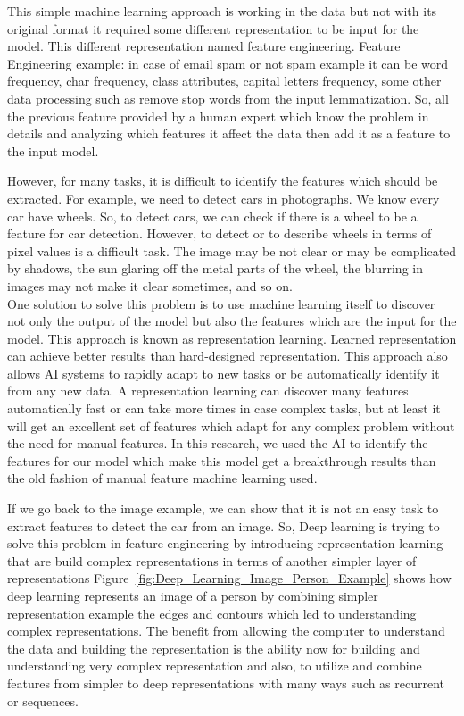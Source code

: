       This simple machine learning approach is working in the data but not with its original format it required some different representation to be input for the model. This different representation named feature engineering. Feature Engineering example: in case of email spam or not spam example it can be word frequency, char frequency, class attributes, capital letters frequency, some other data processing such as remove stop words from the input lemmatization. So, all the previous feature provided by a human expert which know the problem in details and analyzing which features it affect the data then add it as a feature to the input model.
      

      However, for many tasks, it is difficult to identify the features which should be extracted. For example, we need to detect cars in photographs. We know every car have wheels. So, to detect cars, we can check if there is a wheel to be a feature for car detection. However, to detect or to describe wheels in terms of pixel values is a difficult task. The image may be not clear or may be complicated by shadows, the sun glaring off the metal parts of the wheel, the blurring in images may not make it clear sometimes, and so on\cite{Goodfellow-et-al-2016}.\\

      One solution to solve this problem is to use machine learning itself to discover not only the output of the model but also the features which are the input for the model. This approach is known as representation learning. Learned representation can achieve better results than hard-designed representation. This approach also allows AI systems to rapidly adapt to new tasks or be automatically identify it from any new data. A representation learning can discover many features automatically fast or can take more times in case complex tasks, but at least it will get an excellent set of features which adapt for any complex problem without the need for manual features. In this research, we used the AI to identify the features for our model which make this model get a breakthrough results than the old fashion of manual feature machine learning used.

      If we go back to the image example, we can show that it is not an easy task to extract features to detect the car from an image. So, Deep learning is trying to solve this problem in feature engineering by introducing representation learning that are build complex representations in terms of another simpler layer of representations Figure~\ref{fig:Deep_Learning_Image_Person_Example} shows how deep learning represents an image of a person by combining simpler representation example the edges and contours which led to understanding complex representations. The benefit from allowing the computer to understand the data and building the representation is the ability now for building and understanding very complex representation and also, to utilize and combine features from simpler to deep representations with many ways such as recurrent or sequences.

